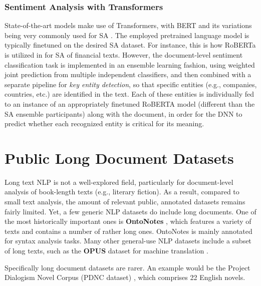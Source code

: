 \documentclass[preprint,review,10pt]{elsarticle}
\begin{document}
	\subsubsection{Sentiment Analysis with Transformers}
	State-of-the-art models make use of Transformers, with BERT and its variations being very commonly used for SA \cite{toutanova}. The employed pretrained language model is typically finetuned on the desired SA dataset. For instance, this is how RoBERTa is utilized in \cite{xinzhao} for SA of financial texts. However, the document-level sentiment classification task is implemented in an ensemble learning fashion, using weighted joint prediction from multiple independent classifiers, and then combined with a separate pipeline for \textit{key entity detection}, so that specific entities (e.g., companies, countries, etc.) are identified in the text. Each of these entities is individually fed to an instance of an appropriately finetuned RoBERTA model (different than the SA ensemble participants) along with the document, in order for the DNN to predict whether each recognized entity is critical for its meaning.
	
	\section{Public Long Document Datasets}
	\label{sec::Datasets}
	Long text NLP is not a well-explored field, particularly for document-level analysis of book-length texts (e.g., literary fiction). As a result, compared to small text analysis, the amount of relevant public, annotated datasets remains fairly limited. Yet, a few generic NLP datasets do include long documents. One of the most historically important ones is \textbf{OntoNotes} \cite{ontonotes}, which features a variety of texts and contains a number of rather long ones. OntoNotes is mainly annotated for syntax analysis tasks. Many other general-use NLP datasets include a subset of long texts, such as the \textbf{OPUS} dataset for machine translation \cite{tiedemann}.
	
	
	Specifically long document datasets are rarer. An example would be the Project Dialogism Novel Corpus (PDNC dataset) \cite{vishnubhotla2022project}, which comprises 22 English novels.
	
\end{document}
